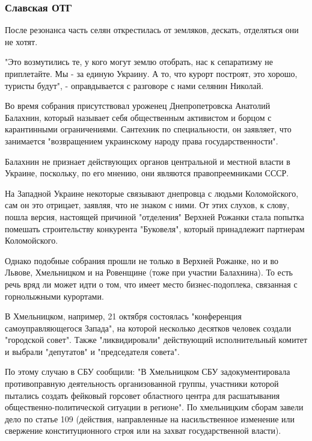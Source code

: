  
 
 
 
 

\subsubsection{Славская ОТГ}

После резонанса часть селян открестилась от земляков, дескать, отделяться
они не хотят.

"Это возмутились те, у кого могут землю отобрать, нас к сепаратизму не
приплетайте. Мы - за единую Украину. А то, что курорт построят, это
хорошо, туристы будут", - оправдывается с разговоре с нами селянин
Николай.     

Во время собрания присутствовал уроженец Днепропетровска Анатолий
Балахнин, который называет себя общественным активистом и борцом с
карантинными ограничениями. Сантехник по специальности, он заявляет, что
занимается "возвращением украинскому народу права государственности".

Балахнин не признает действующих органов центральной и местной власти в
Украине, поскольку, по его мнению, они являются правопреемниками СССР.

На Западной Украине некоторые связывают днепровца с людьми Коломойского,
сам он это отрицает, заявляя, что не знаком с ними. От этих слухов, к
слову, пошла версия, настоящей причиной "отделения" Верхней Рожанки стала
попытка помешать строительству конкурента "Буковеля", который принадлежит
партнерам Коломойского.

Однако подобные собрания прошли не только в Верхней Рожанке, но и во
Львове, Хмельницком и на Ровенщине (тоже при участии Балахнина). То есть
речь вряд ли может идти о том, что имеет место бизнес-подоплека, связанная
с горнолыжными курортами.

В Хмельницком, например, 21 октября состоялась "конференция
самоуправляющегося Запада", на которой несколько десятков человек создали
"городской совет". Также "ликвидировали" действующий исполнительный
комитет и выбрали "депутатов" и "председателя совета".

По этому случаю в СБУ сообщили: "В Хмельницком СБУ задокументировала
противоправную деятельность организованной группы, участники которой
пытались создать фейковый горсовет областного центра для расшатывания
общественно-политической ситуации в регионе". По хмельницким сборам завели
дело по статье 109 (действия, направленные на насильственное изменение или
свержение конституционного строя или на захват государственной власти).

